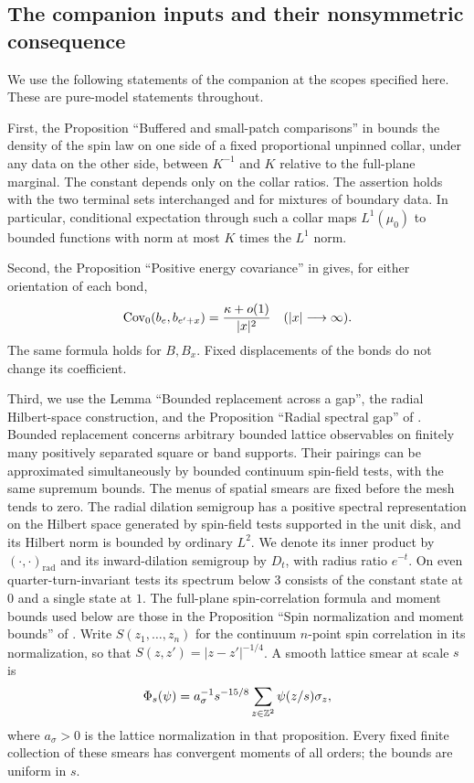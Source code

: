 \subsection{The companion inputs and their nonsymmetric consequence}

We use the following statements of the companion at the scopes specified
here.  These are pure-model statements throughout.

First, the Proposition ``Buffered and small-patch comparisons'' in
\cite[Section~2]{S} bounds the density of the spin law on one side of a
fixed proportional unpinned collar, under any data on the other side,
between $K^{-1}$ and $K$ relative to the full-plane marginal.  The constant
depends only on the collar ratios.  The assertion holds with the two
terminal sets interchanged and for mixtures of boundary data.  In particular,
conditional expectation through such a collar maps $L^1(\mu_0)$ to bounded
functions with norm at most $K$ times the $L^1$ norm.

Second, the Proposition ``Positive energy covariance'' in
\cite[Section~2]{S} gives, for either orientation of each bond,
\begin{equation}
 \operatorname{Cov}_0(b_e,b_{e'+x})=\frac{\kappa+o(1)}{|x|^2}
 \quad (|x|\longrightarrow\infty).
 \label{pure:energy-input}
\end{equation}
The same formula holds for $B,B_x$.  Fixed displacements of the bonds do
not change its coefficient.

Third, we use the Lemma ``Bounded replacement across a gap'', the radial
Hilbert-space construction, and the Proposition ``Radial spectral gap''
of \cite[Section~3]{S}.  Bounded replacement concerns arbitrary bounded
lattice observables on finitely many positively separated square or band
supports.  Their pairings can be approximated simultaneously by bounded
continuum spin-field tests, with the same supremum bounds.  The menus of
spatial smears are fixed before the mesh tends to zero.  The radial
dilation semigroup has a positive spectral representation on the Hilbert
space generated by spin-field tests supported in the unit disk, and its
Hilbert norm is bounded by ordinary $L^2$.  We denote its inner product
by $(\cdot,\cdot)_{\mathrm{rad}}$ and its inward-dilation semigroup by
$D_t$, with radius ratio $e^{-t}$.  On even quarter-turn-invariant tests its spectrum below $3$
consists of the constant state at $0$ and a single state at $1$.
The full-plane spin-correlation formula and moment bounds used below are
those in the Proposition ``Spin normalization and moment bounds''
of \cite[Section~2]{S}.  Write $S(z_1,\ldots,z_n)$ for the continuum
$n$-point spin correlation in its normalization, so that
$S(z,z')=|z-z'|^{-1/4}$.  A smooth lattice smear at scale $s$ is
\[
 \Phi_s(\psi)=a_\sigma^{-1}s^{-15/8}
                  \sum_{z\in\mathbb Z^2}\psi(z/s)\sigma_z,
\]
where $a_\sigma>0$ is the lattice normalization in that proposition.
Every fixed finite collection of these smears has convergent moments of
all orders; the bounds are uniform in $s$.


